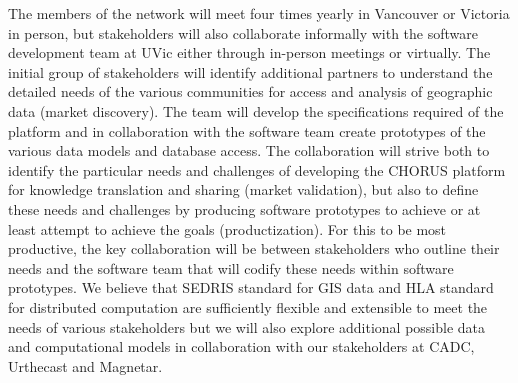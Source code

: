 The members of the network will meet four times yearly in Vancouver or
Victoria in person, but stakeholders will also collaborate informally
with the software development team at UVic either through in-person
meetings or virtually.  The initial group of stakeholders will
identify additional partners to understand the detailed needs of the
various communities for access and analysis of geographic data (market
discovery).  The team will develop the specifications required of the
platform and in collaboration with the software team create prototypes
of the various data models and database access.  The collaboration
will strive both to identify the particular needs and challenges of
developing the CHORUS platform for knowledge translation and sharing
(market validation), but also to define these needs and challenges by
producing software prototypes to achieve or at least attempt to
achieve the goals (productization).  For this to be most productive,
the key collaboration will be between stakeholders who outline their
needs and the software team that will codify these needs within
software prototypes.  We believe that SEDRIS standard for GIS data and
HLA standard for distributed computation are sufficiently flexible and
extensible to meet the needs of various stakeholders but we will also
explore additional possible data and computational models in
collaboration with our stakeholders at CADC, Urthecast and Magnetar.



          
